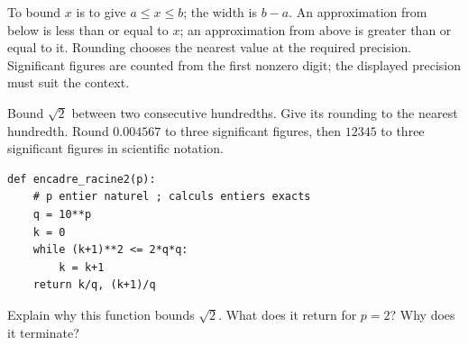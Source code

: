 \begin{keypoint}[Vocabulary]
To bound $x$ is to give $a\leq x\leq b$; the width is $b-a$. An approximation from below is less than or equal to $x$; an approximation from above is greater than or equal to it. Rounding chooses the nearest value at the required precision.
Significant figures are counted from the first nonzero digit; the displayed precision must suit the context.
\end{keypoint}
\begin{example}Bound $\sqrt2$ between two consecutive hundredths. Give its rounding to the nearest hundredth. Round $\num{0,004567}$ to three significant figures, then $12345$ to three significant figures in scientific notation.\end{example}
\begin{lstlisting}
def encadre_racine2(p):
    # p entier naturel ; calculs entiers exacts
    q = 10**p
    k = 0
    while (k+1)**2 <= 2*q*q:
        k = k+1
    return k/q, (k+1)/q
\end{lstlisting}
\begin{example}Explain why this function bounds $\sqrt2$. What does it return for $p=2$? Why does it terminate?\end{example}
